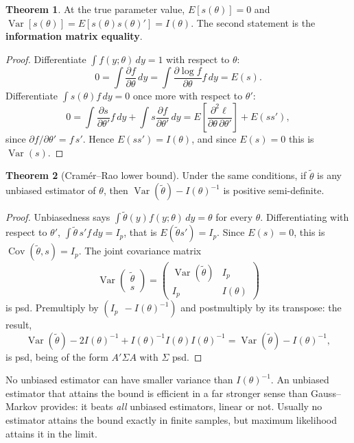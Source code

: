 \documentclass[11pt,a4paper]{article}
\numberwithin{equation}{section}
\DeclareMathOperator{\Var}{Var}
\DeclareMathOperator{\Cov}{Cov}
\theoremstyle{definition}
\newtheorem{thm}{Theorem}[subsection]
\begin{document}
\begin{thm}
\label{thm:score}
At the true parameter value, $E[s(\theta)] = 0$ and $\Var[s(\theta)] = E[s(\theta)s(\theta)'] = I(\theta)$. The second statement is the
\textbf{information matrix equality}.
\end{thm}

\begin{proof}
Differentiate $\int f(y; \theta)\,dy = 1$ with respect to $\theta$:
\[
0 = \int\frac{\partial f}{\partial\theta}\,dy = \int\frac{\partial\log f}{\partial\theta}f\,dy = E(s) .
\]
Differentiate $\int s(\theta)f\,dy = 0$ once more with respect to $\theta'$:
\[
0 = \int\frac{\partial s}{\partial\theta'}f\,dy + \int s\frac{\partial f}{\partial\theta'}\,dy = E\left[\frac{\partial^2\ell}{\partial\theta\,\partial\theta'}\right] + E(ss') ,
\]
since $\partial f/\partial\theta' = f\,s'$. Hence $E(ss') = I(\theta)$, and since $E(s) = 0$ this is $\Var(s)$.
\end{proof}

\begin{thm}[Cram\'er--Rao lower bound]
\label{thm:crlb}
Under the same conditions, if $\tilde\theta$ is any unbiased estimator of $\theta$, then $\Var(\tilde\theta) - I(\theta)^{-1}$ is positive semi-definite.
\end{thm}

\begin{proof}
Unbiasedness says $\int\tilde\theta(y)f(y; \theta)\,dy = \theta$ for every $\theta$. Differentiating with respect to $\theta'$,
$\int\tilde\theta\,s'f\,dy = I_p$, that is $E(\tilde\theta s') = I_p$. Since $E(s) = 0$, this is $\Cov(\tilde\theta, s) = I_p$. The joint covariance matrix
\[
\Var\begin{pmatrix} \tilde\theta \\ s \end{pmatrix} = \begin{pmatrix} \Var(\tilde\theta) & I_p \\ I_p & I(\theta) \end{pmatrix}
\]
is psd. Premultiply by $(I_p\ \ -I(\theta)^{-1})$ and postmultiply by its transpose: the result,
\[
\Var(\tilde\theta) - 2I(\theta)^{-1} + I(\theta)^{-1}I(\theta)I(\theta)^{-1} = \Var(\tilde\theta) - I(\theta)^{-1},
\]
is psd, being of the form $A'\Sigma A$ with $\Sigma$ psd.
\end{proof}

No unbiased estimator can have smaller variance than $I(\theta)^{-1}$. An unbiased estimator that attains the bound is efficient in a far stronger
sense than Gauss--Markov provides: it beats \emph{all} unbiased estimators, linear or not. Usually no estimator attains the bound exactly in finite
samples, but maximum likelihood attains it in the limit.
\end{document}
